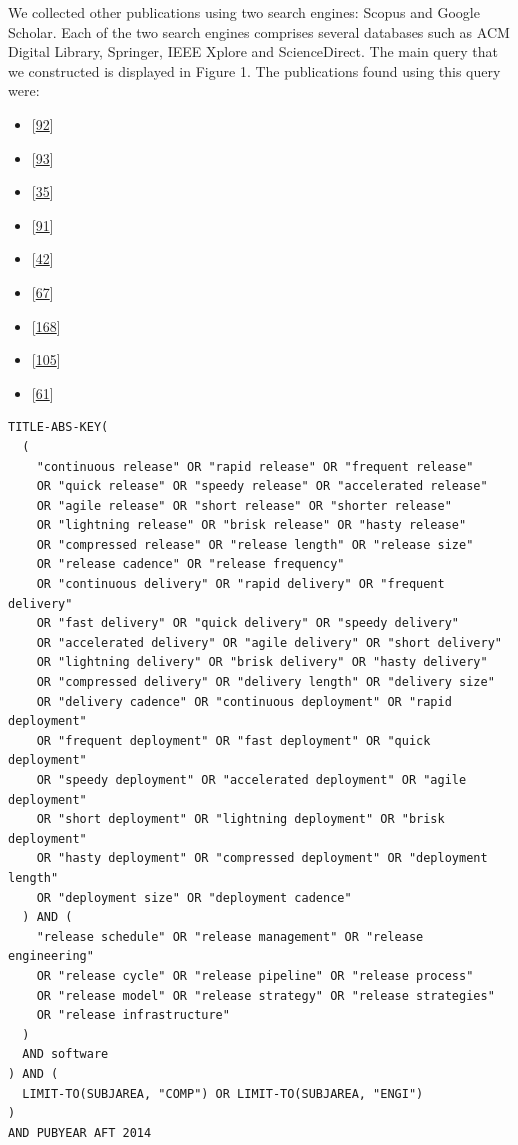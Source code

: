 \documentclass[]{book}
\providecommand{\tightlist}{%
  \setlength{\itemsep}{0pt}\setlength{\parskip}{0pt}}
\begin{document}
We collected other publications using two search engines: Scopus and
Google Scholar. Each of the two search engines comprises several
databases such as ACM Digital Library, Springer, IEEE Xplore and
ScienceDirect. The main query that we constructed is displayed in Figure
1. The publications found using this query were:

\begin{itemize}
\tightlist
\item
  {[}\protect\hyperlink{ref-kaur2019a}{92}{]}
\item
  {[}\protect\hyperlink{ref-kerzazi2013a}{93}{]}
\item
  {[}\protect\hyperlink{ref-castelluccio2017a}{35}{]}
\item
  {[}\protect\hyperlink{ref-karvonen2017a}{91}{]}
\item
  {[}\protect\hyperlink{ref-claes2017a}{42}{]}
\item
  {[}\protect\hyperlink{ref-fujibayashi2017a}{67}{]}
\item
  {[}\protect\hyperlink{ref-souza2015a}{168}{]}
\item
  {[}\protect\hyperlink{ref-laukkanen2018a}{105}{]}
\item
  {[}\protect\hyperlink{ref-dyck2015a}{61}{]}
\end{itemize}

\begin{verbatim}
TITLE-ABS-KEY(
  (
    "continuous release" OR "rapid release" OR "frequent release"
    OR "quick release" OR "speedy release" OR "accelerated release"
    OR "agile release" OR "short release" OR "shorter release"
    OR "lightning release" OR "brisk release" OR "hasty release"
    OR "compressed release" OR "release length" OR "release size"
    OR "release cadence" OR "release frequency"
    OR "continuous delivery" OR "rapid delivery" OR "frequent delivery"
    OR "fast delivery" OR "quick delivery" OR "speedy delivery"
    OR "accelerated delivery" OR "agile delivery" OR "short delivery"
    OR "lightning delivery" OR "brisk delivery" OR "hasty delivery"
    OR "compressed delivery" OR "delivery length" OR "delivery size"
    OR "delivery cadence" OR "continuous deployment" OR "rapid deployment"
    OR "frequent deployment" OR "fast deployment" OR "quick deployment"
    OR "speedy deployment" OR "accelerated deployment" OR "agile deployment"
    OR "short deployment" OR "lightning deployment" OR "brisk deployment"
    OR "hasty deployment" OR "compressed deployment" OR "deployment length"
    OR "deployment size" OR "deployment cadence"
  ) AND (
    "release schedule" OR "release management" OR "release engineering"
    OR "release cycle" OR "release pipeline" OR "release process"
    OR "release model" OR "release strategy" OR "release strategies"
    OR "release infrastructure"
  )
  AND software
) AND (
  LIMIT-TO(SUBJAREA, "COMP") OR LIMIT-TO(SUBJAREA, "ENGI")
)
AND PUBYEAR AFT 2014
\end{verbatim}
\end{document}
